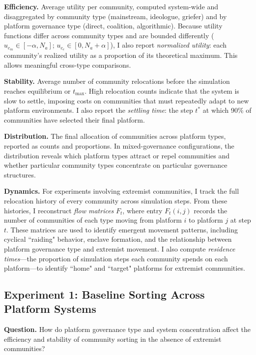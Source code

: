 \documentclass[12pt]{article}
\begin{document}
\textbf{Efficiency.} Average utility per community, computed system-wide and disaggregated by community type (mainstream, ideologue, griefer) and by platform governance type (direct, coalition, algorithmic). Because utility functions differ across community types and are bounded differently ($u_{c_m} \in [-\alpha, N_a]$; $u_{c_e} \in [0, N_a + \alpha]$), I also report \textit{normalized utility}: each community's realized utility as a proportion of its theoretical maximum. This allows meaningful cross-type comparisons.

\textbf{Stability.} Average number of community relocations before the simulation reaches equilibrium or $t_{\max}$. High relocation counts indicate that the system is slow to settle, imposing costs on communities that must repeatedly adapt to new platform environments. I also report the \textit{settling time}: the step $t^*$ at which 90\% of communities have selected their final platform.

\textbf{Distribution.} The final allocation of communities across platform types, reported as counts and proportions. In mixed-governance configurations, the distribution reveals which platform types attract or repel communities and whether particular community types concentrate on particular governance structures.

\textbf{Dynamics.} For experiments involving extremist communities, I track the full relocation history of every community across simulation steps. From these histories, I reconstruct \textit{flow matrices} $F_t$, where entry $F_t(i,j)$ records the number of communities of each type moving from platform $i$ to platform $j$ at step $t$. These matrices are used to identify emergent movement patterns, including cyclical ``raiding" behavior, enclave formation, and the relationship between platform governance type and extremist movement. I also compute \textit{residence times}---the proportion of simulation steps each community spends on each platform---to identify ``home" and ``target" platforms for extremist communities.

\subsection{Experiment 1: Baseline Sorting Across Platform Systems}
\label{sec:exp1}

\textbf{Question.} How do platform governance type and system concentration affect the efficiency and stability of community sorting in the absence of extremist communities?
\end{document}
